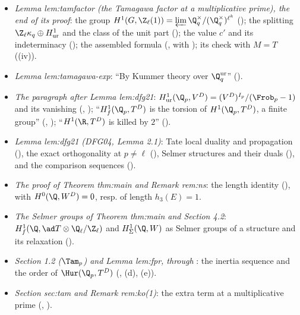 \begin{itemize}
\item \emph{Lemma lem:tamfactor (the Tamagawa factor at a multiplicative prime), the end of its proof}: the group $H^1(G,\Z_\ell(1))=\varprojlim\Q_q^\times/(\Q_q^\times)^{\ell^k}$
(); the splitting $\Z_\ell\kappa_q\oplus H^1_{\mathrm{ur}}$ and the class of the unit part
(); the value $c'$ and its indeterminacy (); the
assembled formula (, with ); its check with $M=T$ ((iv)).
\item \emph{Lemma lem:tamagawa-exp}: ``By Kummer theory over $\Q_q^{\mathrm{ur}}$'' ().
\item \emph{The paragraph after Lemma lem:dfg21}: $H^1_{\mathrm{ur}}(\Q_p,V^D)=(V^D)^{I_p}/(\Frob_p-1)$ and its vanishing (,
); ``$H^1_f(\Q_p,T^D)$ is the torsion of $H^1(\Q_p,T^D)$, a finite group'' (, ); ``$H^1(\R,T^D)$ is
killed by $2$'' ().
\item \emph{Lemma lem:dfg21 (DFG04, Lemma 2.1)}: Tate local duality and propagation (), the exact orthogonality at
$p\ne\ell$ (), Selmer structures and their duals (), and
the comparison sequences ().
\item \emph{The proof of Theorem thm:main and Remark rem:ns}: the length identity (), with $H^0(\Q,W^D)=0$, resp. of length $h_3(E)=1$.
\item \emph{The Selmer groups of Theorem thm:main and Section 4.2}: $H^1_f(\Q,\ad T\otimes\Q_\ell/\Z_\ell)$ and $H^1_\Sigma(\Q,W)$ as Selmer groups of a structure and its relaxation
().
\item \emph{Section 1.2 ($\Tam_p$) and Lemma lem:fpr, through }: the inertia sequence and the order of $\Hur(\Q_p,T^D)$
(, (d), (e)).
\item \emph{Section sec:tam and Remark rem:ko(1)}: the extra term at a multiplicative prime (, ).
\end{itemize}

